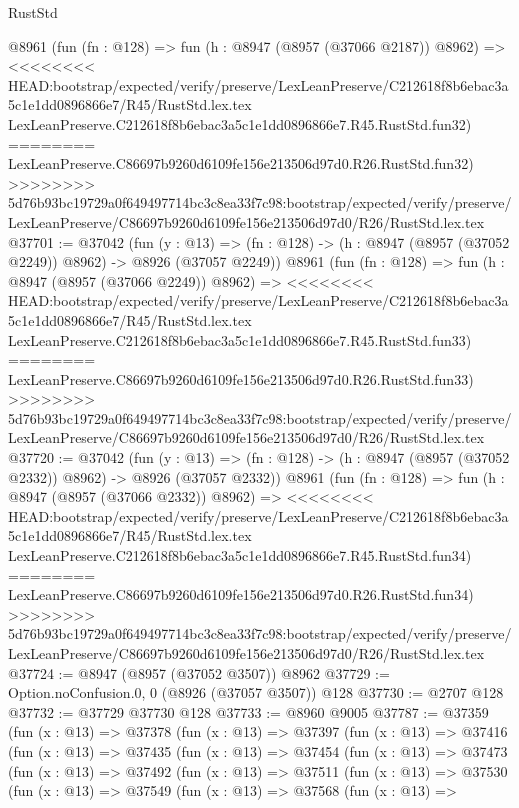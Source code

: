 \begin{lexlean}{RustStd}
\begin{coremodule}
{\begin{coremodule}
{{{{{{{{{{{{{{{{{{{{{{{{{{{{{{{{{{{{{{{    @8961
    (fun (fn : @128) =>
    fun (h : @8947 (@8957 (@37066 @2187)) @8962) =>
<<<<<<<< HEAD:bootstrap/expected/verify/preserve/LexLeanPreserve/C212618f8b6ebac3a5c1e1dd0896866e7/R45/RustStd.lex.tex
    LexLeanPreserve.C212618f8b6ebac3a5c1e1dd0896866e7.R45.RustStd.fun32)
========
    LexLeanPreserve.C86697b9260d6109fe156e213506d97d0.R26.RustStd.fun32)
>>>>>>>> 5d76b93bc19729a0f649497714bc3c8ea33f7c98:bootstrap/expected/verify/preserve/LexLeanPreserve/C86697b9260d6109fe156e213506d97d0/R26/RustStd.lex.tex
@37701 := @37042
    (fun (y : @13) =>
    (fn : @128) -> (h : @8947 (@8957 (@37052 @2249)) @8962) -> @8926 (@37057 @2249))
    @8961
    (fun (fn : @128) =>
    fun (h : @8947 (@8957 (@37066 @2249)) @8962) =>
<<<<<<<< HEAD:bootstrap/expected/verify/preserve/LexLeanPreserve/C212618f8b6ebac3a5c1e1dd0896866e7/R45/RustStd.lex.tex
    LexLeanPreserve.C212618f8b6ebac3a5c1e1dd0896866e7.R45.RustStd.fun33)
========
    LexLeanPreserve.C86697b9260d6109fe156e213506d97d0.R26.RustStd.fun33)
>>>>>>>> 5d76b93bc19729a0f649497714bc3c8ea33f7c98:bootstrap/expected/verify/preserve/LexLeanPreserve/C86697b9260d6109fe156e213506d97d0/R26/RustStd.lex.tex
@37720 := @37042
    (fun (y : @13) =>
    (fn : @128) -> (h : @8947 (@8957 (@37052 @2332)) @8962) -> @8926 (@37057 @2332))
    @8961
    (fun (fn : @128) =>
    fun (h : @8947 (@8957 (@37066 @2332)) @8962) =>
<<<<<<<< HEAD:bootstrap/expected/verify/preserve/LexLeanPreserve/C212618f8b6ebac3a5c1e1dd0896866e7/R45/RustStd.lex.tex
    LexLeanPreserve.C212618f8b6ebac3a5c1e1dd0896866e7.R45.RustStd.fun34)
========
    LexLeanPreserve.C86697b9260d6109fe156e213506d97d0.R26.RustStd.fun34)
>>>>>>>> 5d76b93bc19729a0f649497714bc3c8ea33f7c98:bootstrap/expected/verify/preserve/LexLeanPreserve/C86697b9260d6109fe156e213506d97d0/R26/RustStd.lex.tex
@37724 := @8947 (@8957 (@37052 @3507)) @8962
@37729 := Option.noConfusion.{0, 0} (@8926 (@37057 @3507)) @128
@37730 := @2707 @128
@37732 := @37729 @37730 @128
@37733 := @8960 @9005
@37787 := @37359
    (fun (x : @13) =>
    @37378
      (fun (x : @13) =>
      @37397
        (fun (x : @13) =>
        @37416
          (fun (x : @13) =>
          @37435
            (fun (x : @13) =>
            @37454
              (fun (x : @13) =>
              @37473
                (fun (x : @13) =>
                @37492
                  (fun (x : @13) =>
                  @37511
                    (fun (x : @13) =>
                    @37530
                      (fun (x : @13) =>
                      @37549
                        (fun (x : @13) =>
                        @37568
                          (fun (x : @13) =>
}}}}}}}}}}}}}}}}}}}}}}}}}}}}}}}}}}}}}}}
\end{coremodule}}
\end{coremodule}
\end{lexlean}
